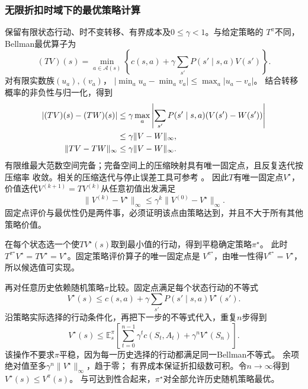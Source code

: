 \subsubsection{无限折扣时域下的最优策略计算}

保留有限状态行动、时不变转移、有界成本及$0\leq\gamma<1$。与给定策略的
$T^\pi$不同，Bellman最优算子为
\begin{equation}
  (TV)(s)=\min_{a\in\mathcal A(s)}
    \left\{c(s,a)+\gamma\sum_{s'}P(s'\mid s,a)V(s')\right\}.
  \label{eq:decision-discounted-bellman-operator}
\end{equation}
对有限实数族$(u_a),(v_a)$，
$|\min_a u_a-\min_a v_a|\leq\max_a|u_a-v_a|$。
结合转移概率的非负性与归一化，得到
\begin{align}
  |(TV)(s)-(TW)(s)|
  &\leq\gamma\max_a
    \left|\sum_{s'}P(s'\mid s,a)(V(s')-W(s'))\right|\notag\\
  &\leq\gamma\lVert V-W\rVert_\infty,
  \label{eq:decision-bellman-contraction-pointwise}\\
  \lVert TV-TW\rVert_\infty&\leq\gamma\lVert V-W\rVert_\infty.
  \label{eq:decision-bellman-contraction}
\end{align}
有限维最大范数空间完备；完备空间上的压缩映射具有唯一固定点，且反复迭代按压缩率
收敛。相关的压缩迭代与停止误差工具可参考
。
因此$T$有唯一固定点$V^\star$，价值迭代$V^{(k+1)}=TV^{(k)}$从任意初值出发满足
\begin{equation}
  \lVert V^{(k)}-V^\star\rVert_\infty
  \leq\gamma^k\lVert V^{(0)}-V^\star\rVert_\infty.
  \label{eq:decision-value-iteration-error}
\end{equation}
固定点评价与最优性仍是两件事，必须证明该点由策略达到，并且不大于所有其他策略价值。

在每个状态选一个使$TV^\star(s)$取到最小值的行动，得到平稳确定策略$\pi^\star$。
此时$T^{\pi^\star}V^\star=TV^\star=V^\star$。固定策略评价算子的唯一固定点是
$V^{\pi^\star}$，由唯一性得$V^{\pi^\star}=V^\star$，所以候选值可实现。

再对任意历史依赖随机策略$\pi$比较。固定点满足每个状态行动的不等式
\[
  V^\star(s)\leq c(s,a)+\gamma\sum_{s'}P(s'\mid s,a)V^\star(s').
\]
沿策略实际选择的行动条件化，再把下一步的不等式代入，重复$n$步得到
\begin{equation}
  V^\star(s)\leq\mathbb E_s^\pi
  \left[\sum_{t=0}^{n-1}\gamma^tc(S_t,A_t)+\gamma^nV^\star(S_n)\right].
  \label{eq:decision-discounted-all-policy-comparison}
\end{equation}
该操作不要求$\pi$平稳，因为每一历史选择的行动都满足同一Bellman不等式。
余项绝对值至多$\gamma^n\lVert V^\star\rVert_\infty$，趋于零；
有界成本保证折扣级数可积。令$n\to\infty$得到$V^\star(s)\leq V^\pi(s)$。
与可达到性合起来，$\pi^\star$对全部允许历史随机策略最优。

